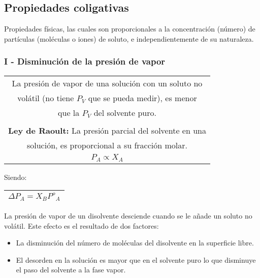     \subsection{Propiedades coligativas}
        \sangria{} Propiedades físicas, las cuales son proporcionales a la concentración (número) de partículas (moléculas o iones) de soluto, e independientemente de su naturaleza.
        \subsubsection{I - Disminución de la presión de vapor}
            \begin{center}
                \begin{tabular}{|m{9cm}|}
                    \toprule
                    \multicolumn{1}{|c|}{La presión de vapor de una solución con un soluto no} \\
                    \multicolumn{1}{|c|}{volátil (no tiene $P_V$ que se pueda medir), es menor} \\
                    \multicolumn{1}{|c|}{que la $P_V$ del solvente puro.} \\
                    \multicolumn{1}{|c|}{} \\
                    \multicolumn{1}{|c|}{\textbf{Ley de Raoult:} La presión parcial del solvente en una} \\
                    \multicolumn{1}{|c|}{solución, es proporcional a su fracción molar.} \\
                    \multicolumn{1}{|c|}{$P_A \propto X_A$} \\
                    \bottomrule
                \end{tabular}
            \end{center}
            \saltoPag{}
            Siendo:
            \begin{center}
                \begin{tabular}{|m{5cm}|}
                    \toprule
                    \multicolumn{1}{|c|}{$\Delta P_A = X_B {P^o}_{A}$} \\
                    \bottomrule
                \end{tabular}
            \end{center}
            \sangria{} La presión de vapor de un disolvente desciende cuando se le añade un soluto no volátil. Este efecto es el resultado de dos factores:
            \begin{itemize}
                \item La disminución del número de moléculas del disolvente en la superficie libre.
                \item El desorden en la solución es mayor que en el solvente puro lo que disminuye el paso del solvente a la fase vapor.
            \end{itemize}
